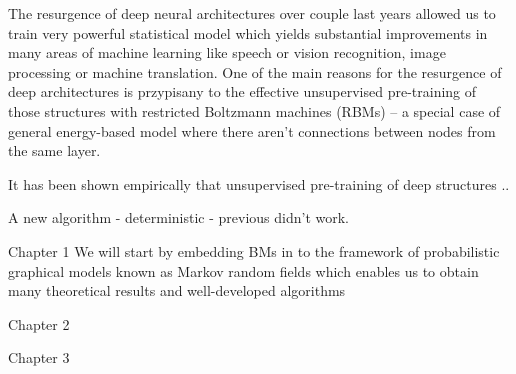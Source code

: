 \documentclass[../report/report.tex]{subfiles}
\begin{document}
The resurgence of deep neural architectures over couple last years allowed us to train very powerful statistical model which yields substantial improvements in many areas of machine learning like speech or vision recognition, image processing or machine translation. One of the main reasons for the resurgence of deep architectures is przypisany to the effective unsupervised pre-training of those structures with restricted Boltzmann machines (RBMs) -- a special case of general energy-based model where there aren't connections between nodes from the same layer. 


It has been shown empirically that unsupervised pre-training of deep structures ..
\cite{erhan2010does}

A new algorithm - deterministic - previous didn't work.

Chapter 1
We will start by embedding BMs in to the framework of probabilistic graphical models known as Markov random fields which enables us to obtain many theoretical results and well-developed algorithms

Chapter 2

Chapter 3
\end{document}
